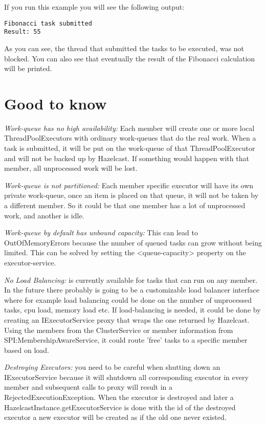 If you run this example you will see the following output:
\begin{lstlisting}
Fibonacci task submitted
Result: 55
\end{lstlisting}
As you can see, the thread that submitted the tasks to be executed, was not blocked. You can also see that eventually the result of the Fibonacci calculation will be printed. 

\section{Good to know}

\emph{Work-queue has no high availability:} Each member will create one or more local ThreadPoolExecutors with ordinary work-queues that do the real work. When a task is submitted, it will be put on the work-queue of that ThreadPoolExecutor and will not be backed up by Hazelcast. If something would happen with that member, all unprocessed work will be lost. 

\emph{Work-queue is not partitioned:} Each member specific executor will have its own private work-queue, once an item is placed on that queue, it will not be taken by a different member. So it could be that one member has a lot of unprocessed work, and another is idle.

\emph{Work-queue by default has unbound capacity:} This can lead to OutOfMemoryErrors because the number of queued tasks can grow without being limited. This can be solved by setting the <queue-capacity> property on the executor-service.

\emph{No Load Balancing:} is currently available for tasks that can run on any member. In the future there probably is going to be a customizable load balancer interface where for example load balancing could be done on the number of unprocessed tasks, cpu load, memory load etc. If load-balancing is needed, it could be done by creating an IExecutorService proxy that wraps the one returned by Hazelcast. Using the members from the ClusterService or  member information from SPI:MembershipAwareService, it could route 'free' tasks to a specific member based on load.

\emph{Destroying Executors:} you need to be careful when shutting down an IExecutorService because it will shutdown all corresponding executor in every member and subsequent calls to proxy will result in a RejectedExecutionException. When the executor is destroyed and later a HazelcastInstance.getExecutorService is done with the id of the destroyed executor a new executor will be created as if the old one never existed.

